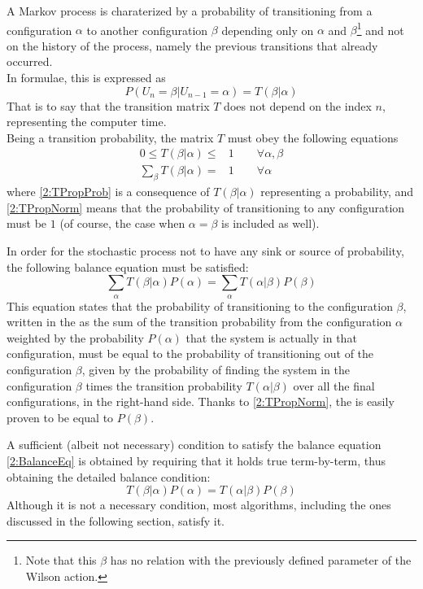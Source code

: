 A Markov process is charaterized by a probability of transitioning from a configuration $\alpha$ to another configuration $\beta$ depending only on $\alpha$ and $\beta$\footnote{Note that this $\beta$ has no relation with the previously defined parameter of the Wilson action.} and not on the history of the process, namely the previous transitions that already occurred.\\
In formulae, this is expressed as
\begin{equation}
    P(U_n=\beta|U_{n-1}=\alpha) = T(\beta|\alpha) \label{2:TransMatrix}
\end{equation}
That is to say that the transition matrix $T$ does not depend on the index $n$, representing the computer time.\\
Being a transition probability, the matrix $T$ must obey the following equations
\begin{align}
    0 \leq T(\beta|\alpha) \leq& 1 \qquad \forall \alpha,\beta \label{2:TPropProb} \\
    \sum_{\beta}T(\beta|\alpha) =& 1 \qquad \forall \alpha \label{2:TPropNorm}
\end{align}
where \eqref{2:TPropProb} is a consequence of $T(\beta|\alpha)$ representing a probability, and \eqref{2:TPropNorm} means that the probability of transitioning to any configuration must be $1$ (of course, the case when $\alpha=\beta$ is included as well).

In order for the stochastic process not to have any sink or source of probability, the following balance equation must be satisfied:
\begin{equation}
    \sum_\alpha T(\beta|\alpha)P(\alpha) = \sum_\alpha T(\alpha|\beta)P(\beta) \label{2:BalanceEq}
\end{equation}
This equation states that the probability of transitioning to the configuration $\beta$, written in the \lhs as the sum of the transition probability from the configuration $\alpha$ weighted by the probability $P(\alpha)$ that the system is actually in that configuration, must be equal to the probability of transitioning out of the configuration $\beta$, given by the probability of finding the system in the configuration $\beta$ times the transition probability $T(\alpha|\beta)$ over all the final configurations, in the right-hand side.
Thanks to \eqref{2:TPropNorm}, the \rhs is easily proven to be equal to $P(\beta)$.

A sufficient (albeit not necessary) condition to satisfy the balance equation \eqref{2:BalanceEq} is obtained by requiring that it holds true term-by-term, thus obtaining the detailed balance condition:
\begin{equation}
    T(\beta|\alpha)P(\alpha) = T(\alpha|\beta)P(\beta) \label{2:DetailedBalance}
\end{equation}
Although it is not a necessary condition, most algorithms, including the ones discussed in the following section, satisfy it.

